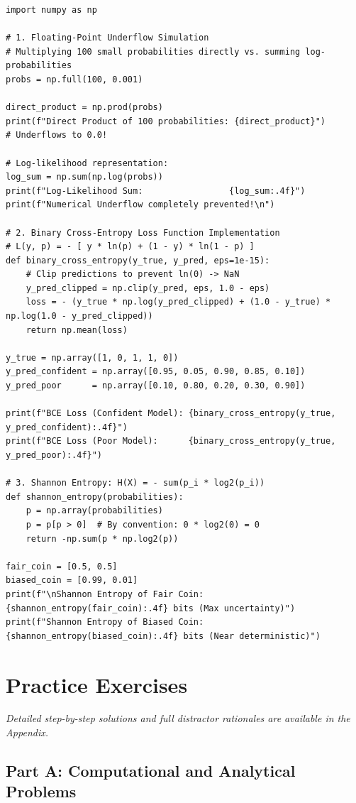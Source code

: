 \begin{lstlisting}[caption={Numerical Stability, Cross-Entropy Loss, and Logarithms in Python}]
import numpy as np

# 1. Floating-Point Underflow Simulation
# Multiplying 100 small probabilities directly vs. summing log-probabilities
probs = np.full(100, 0.001)

direct_product = np.prod(probs)
print(f"Direct Product of 100 probabilities: {direct_product}")
# Underflows to 0.0!

# Log-likelihood representation:
log_sum = np.sum(np.log(probs))
print(f"Log-Likelihood Sum:                 {log_sum:.4f}")
print(f"Numerical Underflow completely prevented!\n")

# 2. Binary Cross-Entropy Loss Function Implementation
# L(y, p) = - [ y * ln(p) + (1 - y) * ln(1 - p) ]
def binary_cross_entropy(y_true, y_pred, eps=1e-15):
    # Clip predictions to prevent ln(0) -> NaN
    y_pred_clipped = np.clip(y_pred, eps, 1.0 - eps)
    loss = - (y_true * np.log(y_pred_clipped) + (1.0 - y_true) * np.log(1.0 - y_pred_clipped))
    return np.mean(loss)

y_true = np.array([1, 0, 1, 1, 0])
y_pred_confident = np.array([0.95, 0.05, 0.90, 0.85, 0.10])
y_pred_poor      = np.array([0.10, 0.80, 0.20, 0.30, 0.90])

print(f"BCE Loss (Confident Model): {binary_cross_entropy(y_true, y_pred_confident):.4f}")
print(f"BCE Loss (Poor Model):      {binary_cross_entropy(y_true, y_pred_poor):.4f}")

# 3. Shannon Entropy: H(X) = - sum(p_i * log2(p_i))
def shannon_entropy(probabilities):
    p = np.array(probabilities)
    p = p[p > 0]  # By convention: 0 * log2(0) = 0
    return -np.sum(p * np.log2(p))

fair_coin = [0.5, 0.5]
biased_coin = [0.99, 0.01]
print(f"\nShannon Entropy of Fair Coin:   {shannon_entropy(fair_coin):.4f} bits (Max uncertainty)")
print(f"Shannon Entropy of Biased Coin: {shannon_entropy(biased_coin):.4f} bits (Near deterministic)")
\end{lstlisting}

\newpage
\section{Practice Exercises}
\textit{Detailed step-by-step solutions and full distractor rationales are available in the Appendix.}

\subsection*{Part A: Computational and Analytical Problems}


